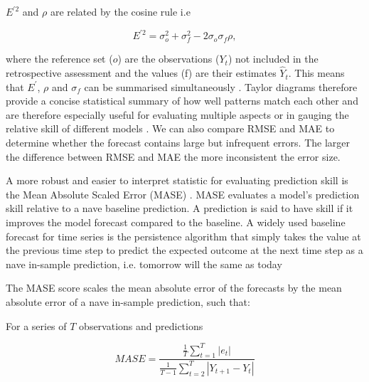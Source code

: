 $E^{\prime 2}$ and $\rho$ are related by the cosine rule i.e

\begin{equation} 
{E^{\prime 2} = \sigma_o^2 + \sigma_f^2 - 2\sigma_o\sigma_f\rho},
\end{equation}

where the reference set ($o$) are the observations ($Y_t$) not included in the retrospective assessment and the values (f) are their estimates ${\hat{Y}_t}$. This means that $E^\prime$, $\rho$ and $\sigma_f$ can be summarised simultaneously  \citep{taylor2001summarizing}. Taylor diagrams therefore provide a concise statistical summary of how well patterns match each other and are therefore especially useful for evaluating multiple aspects or in gauging the relative skill of different models \citep{griggs2002climate}. We can also compare RMSE and MAE to determine whether the forecast contains large but infrequent errors. The larger the difference between RMSE and MAE the more inconsistent the error size.

A more robust and easier to interpret statistic for evaluating prediction skill is the Mean Absolute Scaled Error (MASE) \citep{hyndman2006another}. MASE evaluates a model’s prediction skill relative to a nave baseline prediction. A prediction is said to have skill if it improves the model forecast compared to the baseline. A widely used baseline forecast for time series is the persistence algorithm that simply takes the value at the previous time step to predict the expected outcome at the next time step as a nave in-sample prediction, i.e. tomorrow will the same as today 

The MASE score scales the mean absolute error of the forecasts by the mean absolute error of a nave in-sample prediction, such that:

For a series of $T$ observations and predictions

\begin{equation} 
{MASE=\frac{\frac{1}{T} \sum_{t=1}^{T} \left|e_{t}\right|}
{\frac{1}{T-1} \sum_{t=2}^{T} \left|Y_{t+1}-Y_{t}\right|}}
\end{equation}

